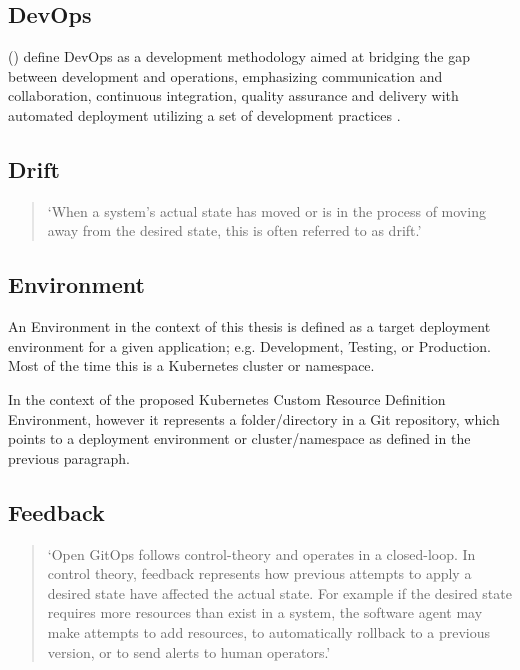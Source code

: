 \subsection*{DevOps}

\citeauthor{devopsDefinition2016} (\citeyear{devopsDefinition2016})
define DevOps as
a development methodology aimed at bridging the gap between
development and operations, emphasizing communication and collaboration,
continuous integration, quality assurance and delivery with automated deployment
utilizing a set of development practices
\autocite{devopsDefinition2016}.

\subsection*{Drift}
\begin{quotation}
\noindent
\enquote*{When a system's actual state has moved or is in the process of moving away from the desired state, this is often referred to as drift.}
\autocite{gitopsGlossary}
\end{quotation}

\subsection*{Environment}

An Environment in the context of this thesis
is defined as a target deployment environment for a given application;
e.g. Development, Testing, or Production.
Most of the time this is a Kubernetes cluster or namespace.

In the context of the proposed Kubernetes Custom Resource Definition
Environment, however it represents a folder/directory in a Git repository,
which points to a deployment environment or cluster/namespace as defined
in the previous paragraph.

\subsection*{Feedback}
\begin{quotation}
	\noindent
	\enquote*{Open GitOps follows control-theory and operates in a closed-loop. In control theory, feedback represents how previous attempts to apply a desired state have affected the actual state. For example if the desired state requires more resources than exist in a system, the software agent may make attempts to add resources, to automatically rollback to a previous version, or to send alerts to human operators.}
	\autocite{gitopsGlossary}
\end{quotation}

